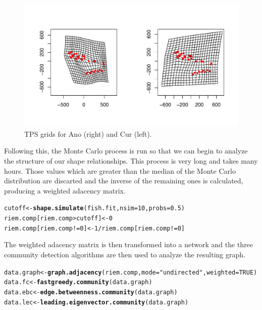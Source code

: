 \documentclass{article}\usepackage{graphicx, color}
\makeatletter
\newcommand{\hlfunctioncall}[1]{\textcolor[rgb]{0.501960784313725,0,0.329411764705882}{\textbf{#1}}}%
\newcommand{\hlstring}[1]{\textcolor[rgb]{0.6,0.6,1}{#1}}%
\newenvironment{kframe}{%
 \def\at@end@of@kframe{}%
 \ifinner\ifhmode%
  \def\at@end@of@kframe{\end{minipage}}%
  \begin{minipage}{\columnwidth}%
 \fi\fi%
 \def\FrameCommand##1{\hskip\@totalleftmargin \hskip-\fboxsep
 \colorbox{shadecolor}{##1}\hskip-\fboxsep
     \hskip-\linewidth \hskip-\@totalleftmargin \hskip\columnwidth}%
 \MakeFramed {\advance\hsize-\width
   \@totalleftmargin\z@ \linewidth\hsize
   \@setminipage}}%
 {\par\unskip\endMakeFramed%
 \at@end@of@kframe}
\newenvironment{knitrout}{}{} %
\makeatother
\begin{document}

\begin{figure}
\includegraphics[height=0.35\textheight]{figure/fish-ex4}
\caption{TPS grids for Ano (right) and Cur (left).\label{fish-tps}}
\end{figure}

Following this, the Monte Carlo process is run so that we can begin to analyze the structure of our shape relationships.
This process is very long and takes many hours.
Those values which are greater than the median of the Monte Carlo distribution are discarted and the inverse of the remaining ones is calculated, producing a weighted adacency matrix.

\begin{knitrout}\scriptsize
{}\color{fgcolor}\begin{kframe}
\begin{alltt}
cutoff <- \hlfunctioncall{shape.simulate}(fish.fit, nsim = 10, probs = 0.5)
riem.comp[riem.comp > cutoff] <- 0
riem.comp[riem.comp != 0] <- 1/riem.comp[riem.comp != 0]
\end{alltt}
\end{kframe}
\end{knitrout}


The weighted adacency matrix is then transformed into a network and the three community detection algorithms are then used to analyze the resulting graph.

\begin{knitrout}\scriptsize
{}\color{fgcolor}\begin{kframe}
\begin{alltt}
data.graph <- \hlfunctioncall{graph.adjacency}(riem.comp, mode = \hlstring{"undirected"}, weighted = TRUE)
data.fc <- \hlfunctioncall{fastgreedy.community}(data.graph)
data.ebc <- \hlfunctioncall{edge.betweenness.community}(data.graph)
data.lec <- \hlfunctioncall{leading.eigenvector.community}(data.graph)
\end{alltt}
\end{kframe}
\end{knitrout}
\end{document}
